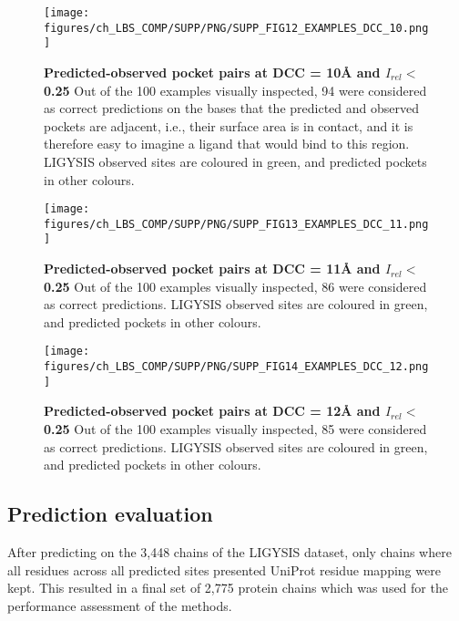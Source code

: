 \begin{figure}[ht!]
    \centering
    \texttt{[image: figures/ch\_LBS\_COMP/SUPP/PNG/SUPP\_FIG12\_EXAMPLES\_DCC\_10.png]}
    \caption[Predicted-observed pocket pairs at DCC = 10\AA{} and $I_{rel} <$ 0.25]{\textbf{Predicted-observed pocket pairs at DCC = 10\AA{} and $I_{rel} <$ 0.25} Out of the 100 examples visually inspected, 94 were considered as correct predictions on the bases that the predicted and observed pockets are adjacent, i.e., their surface area is in contact, and it is therefore easy to imagine a ligand that would bind to this region. LIGYSIS observed sites are coloured in green, and predicted pockets in other colours.}
    \label{fig:DCC_10_examples}
\end{figure}
\FloatBarrier

\begin{figure}[ht!]
    \centering
    \texttt{[image: figures/ch\_LBS\_COMP/SUPP/PNG/SUPP\_FIG13\_EXAMPLES\_DCC\_11.png]}
    \caption[Predicted-observed pocket pairs at DCC = 11\AA{} and $I_{rel} <$ 0.25]{\textbf{Predicted-observed pocket pairs at DCC = 11\AA{} and $I_{rel} <$ 0.25} Out of the 100 examples visually inspected, 86 were considered as correct predictions. LIGYSIS observed sites are coloured in green, and predicted pockets in other colours.}
    \label{fig:DCC_11_examples}
\end{figure}
\FloatBarrier

\begin{figure}[ht!]
    \centering
    \texttt{[image: figures/ch\_LBS\_COMP/SUPP/PNG/SUPP\_FIG14\_EXAMPLES\_DCC\_12.png]}
    \caption[Predicted-observed pocket pairs at DCC = 12\AA{} and $I_{rel} <$ 0.25]{\textbf{Predicted-observed pocket pairs at DCC = 12\AA{} and $I_{rel} <$ 0.25} Out of the 100 examples visually inspected, 85 were considered as correct predictions. LIGYSIS observed sites are coloured in green, and predicted pockets in other colours.}
    \label{fig:DCC_12_examples}
\end{figure}
\FloatBarrier

\subsection{Prediction evaluation}

After predicting on the 3,448 chains of the LIGYSIS dataset, only chains where all residues across all predicted sites presented UniProt residue mapping were kept. This resulted in a final set of 2,775 protein chains which was used for the performance assessment of the methods.


